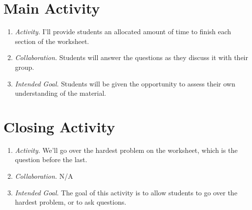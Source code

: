 \documentclass[11pt]{article}
\begin{document}
\section{\centering Main Activity}
	\begin{enumerate}
		\item \textit{Activity.} I'll provide students an allocated amount of time to finish each section of the worksheet.
		\item \textit{Collaboration.} Students will answer the questions as they discuss it with their group.
		\item \textit{Intended Goal.} Students will be given the opportunity to assess their own understanding of the material.
	\end{enumerate}
\section{\centering Closing Activity}
	\begin{enumerate}
		\item \textit{Activity.} We'll go over the hardest problem on the worksheet, which is the question before the last.
		\item \textit{Collaboration.} N/A
		\item \textit{Intended Goal.} The goal of this activity is to allow students to go over the hardest problem, or to ask questions.
	\end{enumerate}
\end{document}
